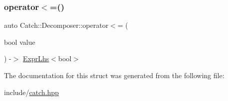 \mbox{\label{structCatch_1_1Decomposer_aac129b94903ae1339d5709049d83613b}} 
\subsubsection{\texorpdfstring{operator$<$=()}{operator<=()}\hspace{0.1cm}{\footnotesize\ttfamily [2/2]}}
{\footnotesize\ttfamily auto Catch\+::\+Decomposer\+::operator$<$= (\begin{DoxyParamCaption}\item[{bool}]{value }\end{DoxyParamCaption}) -\/$>$ \mbox{\hyperlink{classCatch_1_1ExprLhs}{Expr\+Lhs}}$<$bool$>$ \hspace{0.3cm}{\ttfamily [inline]}}



The documentation for this struct was generated from the following file\+:\begin{DoxyCompactItemize}
\item 
include/\mbox{\hyperlink{catch_8hpp}{catch.\+hpp}}\end{DoxyCompactItemize}
